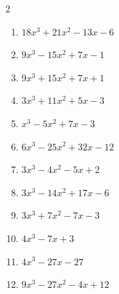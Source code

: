 \begin{multicols}{2}
\begin{enumerate}

  \item $18x^{3}+21x^{2}-13x-6$

        \phantom{$=(2x+3)(3x+1)(3x-2)$}

  \item $9x^{3}-15x^{2}+7x-1$


\columnbreak %

\resetques

  \item $9x^{3}+15x^{2}+7x+1$


  \item $3x^{3}+11x^{2}+5x-3$

        \phantom{$=(3x-1)(x+1)(x+3)$}

  \item $x^{3}-5x^{2}+7x-3$


  \item $6x^{3}-25x^{2}+32x-12$

        \phantom{$=(2x-3)(3x-2)(x-2)$}

  \item $3x^{3}-4x^{2}-5x+2$

        \phantom{$=(3x-1)(x+1)(x-2)$}

\columnbreak %

  \item $3x^{3}-14x^{2}+17x-6$

        \phantom{$=(3x-2)(x-1)(x-3)$}

  \item $3x^{3}+7x^{2}-7x-3$

        \phantom{$=(3x+1)(x+3)(x-1)$}

  \item $4x^{3}-7x+3$

        \phantom{$=(2x+3)(2x-1)(x-1)$}

  \item $4x^{3}-27x-27$


  \item $9x^{3}-27x^{2}-4x+12$

        \phantom{$=(3x+2)(3x-2)(x-3)$}

\columnbreak %

\resetques


\end{enumerate}
\end{multicols}
